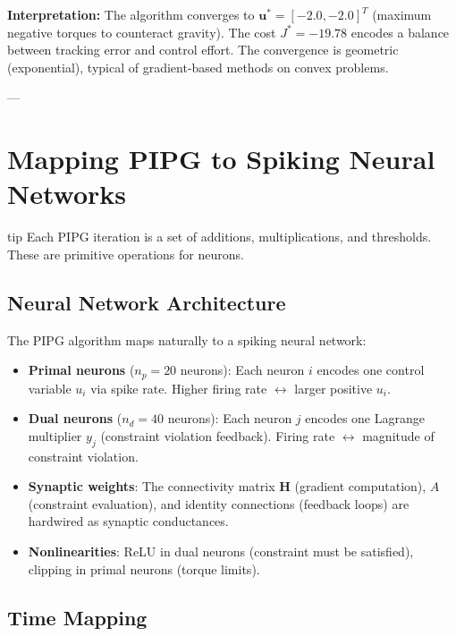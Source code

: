 \textbf{Interpretation:} The algorithm converges to $\mathbf{u}^* = [-2.0, -2.0]^T$ (maximum negative torques to counteract gravity). The cost $J^* = -19.78$ encodes a balance between tracking error and control effort. The convergence is geometric (exponential), typical of gradient-based methods on convex problems.

---

\section{Mapping PIPG to Spiking Neural Networks}
\begin{block}{tip}
Each PIPG iteration is a set of additions, multiplications, and thresholds. These are primitive operations for neurons.
\end{block}

\label{sec:snn-mapping}

\subsection{Neural Network Architecture}

The PIPG algorithm maps naturally to a spiking neural network:

\begin{itemize}
\item \textbf{Primal neurons} ($n_p = 20$ neurons): Each neuron $i$ encodes one control variable $u_i$ via spike rate. Higher firing rate $\leftrightarrow$ larger positive $u_i$.

\item \textbf{Dual neurons} ($n_d = 40$ neurons): Each neuron $j$ encodes one Lagrange multiplier $y_j$ (constraint violation feedback). Firing rate $\leftrightarrow$ magnitude of constraint violation.

\item \textbf{Synaptic weights}: The connectivity matrix $\mathbf{H}$ (gradient computation), $A$ (constraint evaluation), and identity connections (feedback loops) are hardwired as synaptic conductances.

\item \textbf{Nonlinearities}: ReLU in dual neurons (constraint must be satisfied), clipping in primal neurons (torque limits).
\end{itemize}

\subsection{Time Mapping}

